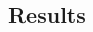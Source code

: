 \documentclass[12pt]{article}
\begin{document}
\begin{spacing}{2.0}
        
            
            
            
                
        
            
            




\section*{Results}


\end{spacing}
\end{document}
